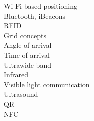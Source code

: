 \begin{description}
	\item[Wi-Fi based positioning]
	
	\item[Bluetooth, iBeacons]
	
	\item[RFID]
	
	\item[Grid concepts]
	
	\item[Angle of arrival]
	
	\item[Time of arrival]
	
	\item[Ultrawide band]
	
	\item[Infrared]
	
	\item[Visible light communication]
	
	\item[Ultrasound]
	
	\item[QR]
	
	\item[NFC]
\end{description}

